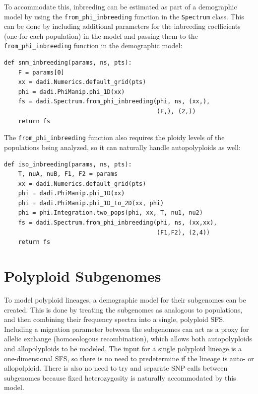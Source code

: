 \documentclass[12pt]{article}
\makeatletter
\newcommand{\py}[1]{\lstinline[language=Python, showstringspaces=False]@#1@}
\makeatother
\begin{document}
To accommodate this, inbreeding can be estimated as part of a demographic model by using the \py{from_phi_inbreeding} function in the \py{Spectrum} class.
This can be done by including additional parameters for the inbreeding coefficients (one for each population) in the model and passing them
to the \py{from_phi_inbreeding} function in the demographic model:

\begin{lstlisting}[caption={\textbf{Inbreeding:} Standard neutral model for a diploid population with inbreeding level \py{F}.}]
def snm_inbreeding(params, ns, pts):
    F = params[0]
    xx = dadi.Numerics.default_grid(pts)
    phi = dadi.PhiManip.phi_1D(xx)
    fs = dadi.Spectrum.from_phi_inbreeding(phi, ns, (xx,),
                                           (F,), (2,))
    return fs
\end{lstlisting}

The \py{from_phi_inbreeding} function also requires the ploidy levels of the populations being analyzed, so it can naturally handle autopolyploids as well:

\begin{lstlisting}[caption={\textbf{Diploid-Tetraploid Isolation Model:} An ancestral population splits at time \py{T} into a diploid (pop 1) and autotetraploid (pop 2) population of sizes \py{nu1} and \py{nu2}, respectively. The populations have separate inbreeding coefficients \py{F1} and \py{F2}.}]
def iso_inbreeding(params, ns, pts):
    T, nuA, nuB, F1, F2 = params
    xx = dadi.Numerics.default_grid(pts)
    phi = dadi.PhiManip.phi_1D(xx)
    phi = dadi.PhiManip.phi_1D_to_2D(xx, phi)
    phi = phi.Integration.two_pops(phi, xx, T, nu1, nu2)
    fs = dadi.Spectrum.from_phi_inbreeding(phi, ns, (xx,xx),
                                           (F1,F2), (2,4))
    return fs
\end{lstlisting}

\section{Polyploid Subgenomes}

To model polyploid lineages, a demographic model for their subgenomes can be created. This is done by treating the subgenomes as analogous to populations, and then combining their frequency spectra into a single, polyploid SFS.
Including a migration parameter between the subgenomes can act as a proxy for allelic exchange (homoeologous recombination), which allows both autopolyploids and allopolyploids to be modeled.
The input for a single polyploid lineage is a one-dimensional SFS, so there is no need to predetermine if the lineage is auto- or allopolploid. There is also no need to try and separate SNP calls
between subgenomes because fixed heterozygosity is naturally accommodated by this model.
\end{document}
